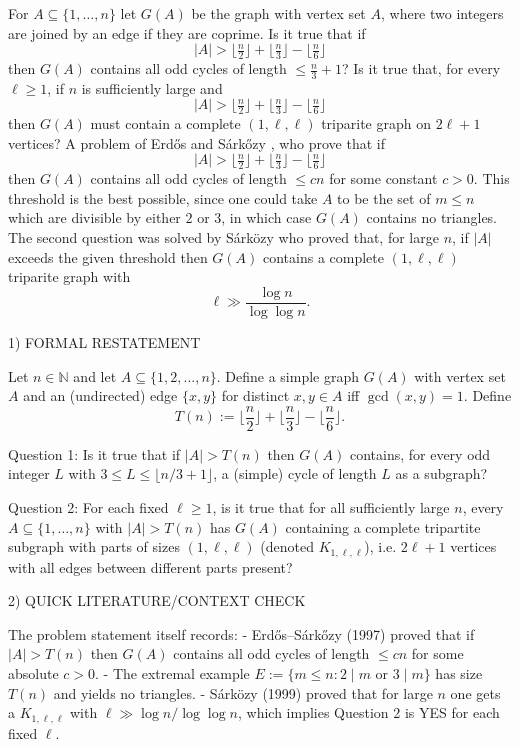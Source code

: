 For $A\subseteq \{1,\ldots,n\}$ let $G(A)$ be the graph with vertex set $A$, where two integers are joined by an edge if they are coprime. Is it true that if\[\lvert A\rvert >\lfloor\tfrac{n}{2}\rfloor+\lfloor\tfrac{n}{3}\rfloor-\lfloor\tfrac{n}{6}\rfloor\]then $G(A)$ contains all odd cycles of length $\leq \frac{n}{3}+1$? Is it true that, for every $\ell\geq 1$, if $n$ is sufficiently large and\[\lvert A\rvert >\lfloor\tfrac{n}{2}\rfloor+\lfloor\tfrac{n}{3}\rfloor-\lfloor\tfrac{n}{6}\rfloor\]then $G(A)$ must contain a complete $(1,\ell,\ell)$ triparite graph on $2\ell+1$ vertices? A problem of Erd\H{o}s and S\'{a}rk\H{o}zy \cite{ErSa97}, who prove that if\[\lvert A\rvert >\lfloor\tfrac{n}{2}\rfloor+\lfloor\tfrac{n}{3}\rfloor-\lfloor\tfrac{n}{6}\rfloor\]then $G(A)$ contains all odd cycles of length $\leq cn$ for some constant $c>0$. This threshold is the best possible, since one could take $A$ to be the set of $m\leq n$ which are divisible by either $2$ or $3$, in which case $G(A)$ contains no triangles. The second question was solved by S\'{a}rk\"{o}zy \cite{Sa99} who proved that, for large $n$, if $\lvert A\rvert$ exceeds the given threshold then $G(A)$ contains a complete $(1,\ell,\ell)$ triparite graph with\[\ell \gg \frac{\log n}{\log\log n}.\]

1) FORMAL RESTATEMENT

Let $n\in\mathbb N$ and let $A\subseteq\{1,2,\dots,n\}$. Define a simple graph $G(A)$ with vertex set $A$ and an (undirected) edge $\{x,y\}$ for distinct $x,y\in A$ iff $\gcd(x,y)=1$.
Define
\[T(n):=\Big\lfloor\frac n2\Big\rfloor+\Big\lfloor\frac n3\Big\rfloor-\Big\lfloor\frac n6\Big\rfloor.
\]

Question 1: Is it true that if $|A|>T(n)$ then $G(A)$ contains, for every odd integer $L$ with $3\le L\le \lfloor n/3+1\rfloor$, a (simple) cycle of length $L$ as a subgraph?

Question 2: For each fixed $\ell\ge 1$, is it true that for all sufficiently large $n$, every $A\subseteq\{1,\dots,n\}$ with $|A|>T(n)$ has $G(A)$ containing a complete tripartite subgraph with parts of sizes $(1,\ell,\ell)$ (denoted $K_{1,\ell,\ell}$), i.e. $2\ell+1$ vertices with all edges between different parts present?

2) QUICK LITERATURE/CONTEXT CHECK

The problem statement itself records:
- Erd\H{o}s--S\'{a}rk\H{o}zy (1997) proved that if $|A|>T(n)$ then $G(A)$ contains all odd cycles of length $\le c n$ for some absolute $c>0$.
- The extremal example $E:=\{m\le n: 2\mid m\text{ or }3\mid m\}$ has size $T(n)$ and yields no triangles.
- S\'{a}rk\"{o}zy (1999) proved that for large $n$ one gets a $K_{1,\ell,\ell}$ with $\ell\gg \log n/\log\log n$, which implies Question 2 is YES for each fixed $\ell$.

